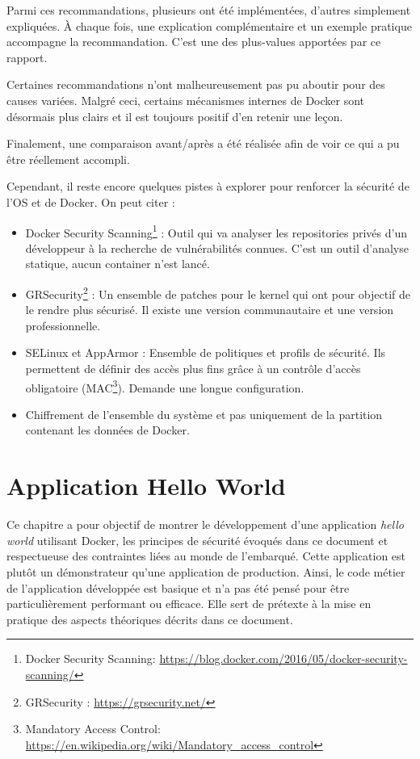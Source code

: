 \documentclass[11pt,a4paper,oneside]{report}
\begin{document}
Parmi ces recommandations, plusieurs ont été implémentées, d'autres simplement expliquées. À chaque fois, une explication complémentaire et un exemple pratique accompagne la recommandation. C'est une des plus-values apportées par ce rapport.

Certaines recommandations n'ont malheureusement pas pu aboutir pour des causes variées. Malgré ceci, certains mécanismes internes de Docker sont désormais plus clairs et il est toujours positif d'en retenir une leçon.

Finalement, une comparaison avant/après a été réalisée afin de voir ce qui a pu être réellement accompli.

Cependant, il reste encore quelques pistes à explorer pour renforcer la sécurité de l'OS et de Docker. On peut citer :
\begin{itemize}
\item Docker Security Scanning\footnote{Docker Security Scanning: \url{https://blog.docker.com/2016/05/docker-security-scanning/}} : Outil qui va analyser les repositories privés d'un développeur à la recherche de vulnérabilités connues. C'est un outil d'analyse statique, aucun container n'est lancé.
\item GRSecurity\footnote{GRSecurity : \url{https://grsecurity.net/}} : Un ensemble de patches pour le kernel qui ont pour objectif de le rendre plus sécurisé. Il existe une version communautaire et une version professionnelle.
\item SELinux et AppArmor : Ensemble de politiques et profils de sécurité. Ils permettent de définir des accès plus fins grâce à un contrôle d'accès obligatoire (MAC\footnote{Mandatory Access Control: \url{https://en.wikipedia.org/wiki/Mandatory_access_control}}). Demande une longue configuration.
\item Chiffrement de l'ensemble du système et pas uniquement de la partition contenant les données de Docker.
\end{itemize}


\chapter{Application Hello World}\label{chp-app-hello-world}
Ce chapitre a pour objectif de montrer le développement d'une application \textit{hello world} utilisant Docker, les principes de sécurité évoqués dans ce document et respectueuse des contraintes liées au monde de l'embarqué. Cette application est plutôt un démonstrateur qu'une application de production. Ainsi, le code métier de l'application développée est basique et n'a pas été pensé pour être particulièrement performant ou efficace. Elle sert de prétexte à la mise en pratique des aspects théoriques décrits dans ce document.
\end{document}
